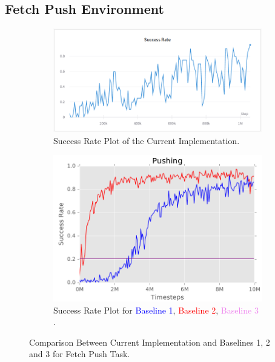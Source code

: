 \subsection{Fetch Push Environment}

\begin{figure}[h!]
     \centering
     \begin{subfigure}[b]{0.4\textwidth}
         \centering
         \includegraphics[width=\textwidth]{images/FPSR.png}
         \caption{Success Rate Plot of the Current Implementation.}
     \end{subfigure}
     \begin{subfigure}[b]{0.4\textwidth}
         \centering
         \includegraphics[width=\textwidth]{images/FPB.png}
         \caption{Success Rate Plot for \textcolor{blue}{Baseline 1}, \textcolor{red}{Baseline 2}, \textcolor{violet}{Baseline 3} \cite{nair2018overcoming}.}
     \end{subfigure}
        \caption{Comparison Between Current Implementation and Baselines 1, 2 and 3 for Fetch Push Task.}
        \label{fig:FPR}
\end{figure}

